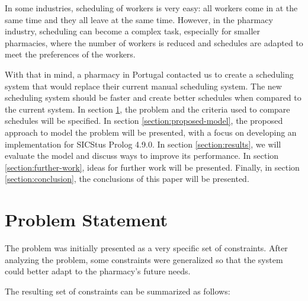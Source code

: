 \documentclass[conference]{IEEEtran}
\begin{document}
In some industries, scheduling of workers is very easy: all workers come in at the same time and they all leave at the same time.
However, in the pharmacy industry, scheduling can become a complex task, especially for smaller pharmacies, where the number of workers is reduced and schedules are adapted to meet the preferences of the workers.

With that in mind, a pharmacy in Portugal contacted us to create a scheduling system that would replace their current manual scheduling system. The new scheduling system should be faster and create better schedules when compared to the current system.
In section \ref{section:problem-statement}, the problem and the criteria used to compare schedules will be specified. In section \ref{section:proposed-model}, the proposed approach to model the problem will be presented, with a focus on developing an implementation for SICStus Prolog 4.9.0. In section \ref{section:results}, we will evaluate the model and discuss ways to improve its performance. In section \ref{section:further-work}, ideas for further work will be presented. Finally, in section \ref{section:conclusion}, the conclusions of this paper will be presented.

\section{Problem Statement}
\label{section:problem-statement}

The problem was initially presented as a very specific set of constraints.
After analyzing the problem, some constraints were generalized so that the system could better adapt to the pharmacy's future needs.

The resulting set of constraints can be summarized as follows:
\end{document}
